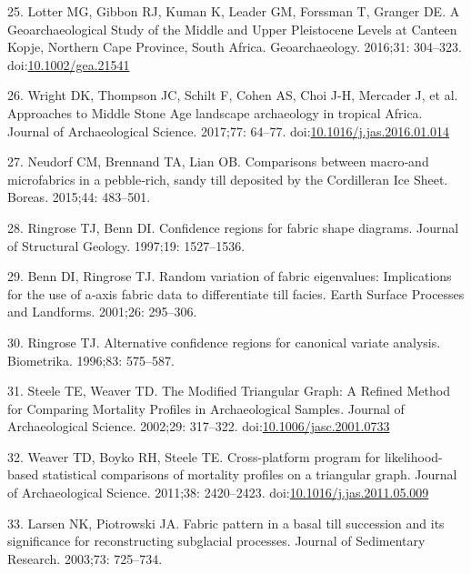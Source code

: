 \documentclass[]{article}
\begin{document}
\hypertarget{ref-lotter_geoarchaeological_2016}{}
25. Lotter MG, Gibbon RJ, Kuman K, Leader GM, Forssman T, Granger DE. A
Geoarchaeological Study of the Middle and Upper Pleistocene Levels at
Canteen Kopje, Northern Cape Province, South Africa. Geoarchaeology.
2016;31: 304--323.
doi:\href{https://doi.org/10.1002/gea.21541}{10.1002/gea.21541}

\hypertarget{ref-wright_approaches_2017}{}
26. Wright DK, Thompson JC, Schilt F, Cohen AS, Choi J-H, Mercader J, et
al. Approaches to Middle Stone Age landscape archaeology in tropical
Africa. Journal of Archaeological Science. 2017;77: 64--77.
doi:\href{https://doi.org/10.1016/j.jas.2016.01.014}{10.1016/j.jas.2016.01.014}

\hypertarget{ref-neudorf_comparisons_2015}{}
27. Neudorf CM, Brennand TA, Lian OB. Comparisons between macro‐and
microfabrics in a pebble‐rich, sandy till deposited by the Cordilleran
Ice Sheet. Boreas. 2015;44: 483--501.

\hypertarget{ref-ringrose_confidence_1997}{}
28. Ringrose TJ, Benn DI. Confidence regions for fabric shape diagrams.
Journal of Structural Geology. 1997;19: 1527--1536.

\hypertarget{ref-benn_random_2001}{}
29. Benn DI, Ringrose TJ. Random variation of fabric eigenvalues:
Implications for the use of a‐axis fabric data to differentiate till
facies. Earth Surface Processes and Landforms. 2001;26: 295--306.

\hypertarget{ref-ringrose_alternative_1996}{}
30. Ringrose TJ. Alternative confidence regions for canonical variate
analysis. Biometrika. 1996;83: 575--587.

\hypertarget{ref-steele_modified_2002}{}
31. Steele TE, Weaver TD. The Modified Triangular Graph: A Refined
Method for Comparing Mortality Profiles in Archaeological Samples.
Journal of Archaeological Science. 2002;29: 317--322.
doi:\href{https://doi.org/10.1006/jasc.2001.0733}{10.1006/jasc.2001.0733}

\hypertarget{ref-weaver_cross-platform_2011}{}
32. Weaver TD, Boyko RH, Steele TE. Cross-platform program for
likelihood-based statistical comparisons of mortality profiles on a
triangular graph. Journal of Archaeological Science. 2011;38:
2420--2423.
doi:\href{https://doi.org/10.1016/j.jas.2011.05.009}{10.1016/j.jas.2011.05.009}

\hypertarget{ref-larsen_fabric_2003}{}
33. Larsen NK, Piotrowski JA. Fabric pattern in a basal till succession
and its significance for reconstructing subglacial processes. Journal of
Sedimentary Research. 2003;73: 725--734.
\end{document}
